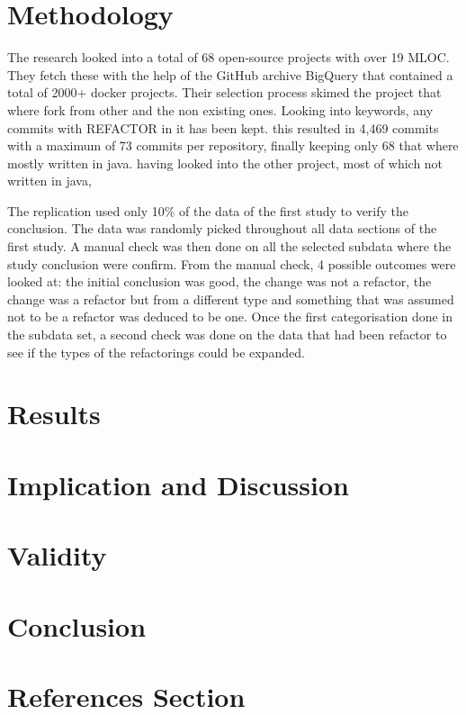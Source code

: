 \documentclass[lettersize,journal]{IEEEtran}
\begin{document}
\section{Methodology}

The research looked into a total of 68 open-source projects with over 19 MLOC. 
They fetch these with the help of the GitHub archive BigQuery that contained a total of 2000+ docker projects.
Their selection process skimed the project that where fork from other and the non existing ones.
Looking into keywords, any commits with REFACTOR in it has been kept.
this resulted in 4,469 commits with a maximum of 73 commits per repository, finally keeping only 68 that where mostly written in java.
having looked into the other project, most of which not written in java, 

The replication used only 10\% of the data of the first study to verify the conclusion.
The data was randomly picked throughout all data sections of the first study. 
A manual check was then done on all the selected subdata where the study conclusion were confirm.
From the manual check, 4 possible outcomes were looked at: the initial conclusion was good, the change was not a refactor, the change was a refactor but from a different type and something that was assumed not to be a refactor was deduced to be one.  
Once the first categorisation done in the subdata set, a second check was done on the data that had been refactor to see if the types of the refactorings could be expanded.

\section{Results}

\section{Implication and Discussion}

\section{Validity}

\section{Conclusion}

\section{References Section}
%
\end{document}
